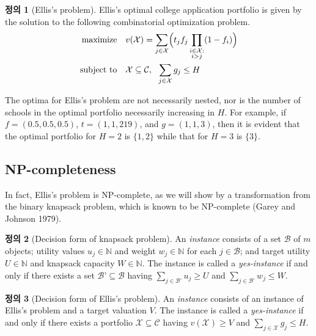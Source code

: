 \documentclass[12pt]{article} %
\newif\ifen
\theoremstyle{definition}
\newtheorem{definition}{Definition}
\theoremstyle{definition}
\newtheorem{definition}{정의}
\begin{document}
\begin{definition}[Ellis's problem]
Ellis's optimal college application portfolio is given by the solution to the following combinatorial optimization problem.
\begin{align}
\begin{split}
\text{maximize}\quad &  v(\mathcal{X}) = \sum_{j\in
\mathcal{X}} \Bigl( t_j f_j  \prod_{\substack{i \in \mathcal{X}: \\ i > j}} (1 - f_{i}) \Bigr)\\
\text{subject to}\quad & \mathcal{X}\subseteq\mathcal{C},~~\sum_{j \in \mathcal{X}} g_j \leq H 
\end{split}
\end{align}
\end{definition}

The optima for Ellis's problem are not necessarily nested, nor is the number of schools in the optimal portfolio necessarily increasing in $H$. For example, if
$f = (0.5, 0.5, 0.5)$, $t = (1, 1, 219)$, and $g = (1, 1, 3)$,
then it is evident that the optimal portfolio for $H = 2$ is $\{1, 2\}$ while that for $H = 3$ is $\{3\}$. 

\ifen \subsection{NP-completeness} \else \subsection{NP-completeness}\fi
In fact, Ellis’s problem is NP-complete, as we will show by a transformation from the binary knapsack problem, which is known to be NP-complete (Garey and Johnson 1979).

\begin{definition}[Decision form of knapsack problem]
An \emph{instance} consists of a set $\mathcal{B}$ of $m$ objects; utility values $u_j \in \mathbb{N}$ and weight $w_j \in \mathbb{N}$ for each $j \in \mathcal{B}$; and target utility $U\in \mathbb{N}$ and knapsack capacity $W\in \mathbb{N}$. The instance is called a \emph{yes-instance} if and only if there exists a set $\mathcal{B’} \subseteq \mathcal{B}$ having $\sum_{j \in \mathcal{B’}} u_j \geq U$ and  $\sum_{j \in \mathcal{B’}} w_j \leq W$.
\end{definition}

\begin{definition}[Decision form of Ellis’s problem]
An \emph{instance} consists of an instance of Ellis’s problem and a target valuation $V$. The instance is called a \emph{yes-instance} if and only if there exists a portfolio $\mathcal{X} \subseteq \mathcal{C}$ having $v(\mathcal{X}) \geq V$ and  $\sum_{j \in \mathcal{X}} g_j \leq H$.
\end{definition}
\end{document}
